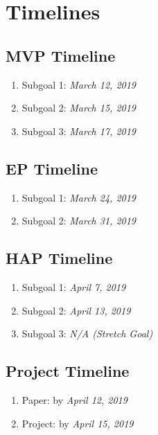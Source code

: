 \documentclass[fleqn,10pt]{SelfArx} %
\begin{document}
\section{Timelines} %
\subsection{MVP Timeline}
\begin{enumerate}
	\item Subgoal 1: \textit{March 12, 2019}
	\item Subgoal 2: \textit{March 15, 2019}
	\item Subgoal 3: \textit{March 17, 2019}
\end{enumerate}

\subsection{EP Timeline}
\begin{enumerate}
	\item Subgoal 1: \textit{March 24, 2019}
	\item Subgoal 2: \textit{March 31, 2019}
\end{enumerate}

\subsection{HAP Timeline}
\begin{enumerate}
	\item Subgoal 1: \textit{April 7, 2019}
	\item Subgoal 2: \textit{April 13, 2019}
	\item Subgoal 3: \textit{N/A (Stretch Goal)}
\end{enumerate}

\subsection{Project Timeline}
\begin{enumerate}
	\item Paper: by \textit{April 12, 2019}
	\item Project: by \textit{April 15, 2019}
\end{enumerate}

\end{document}
